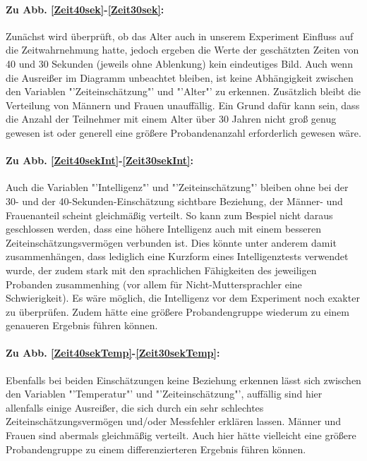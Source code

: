 \documentclass{Paper}
\begin{document}
\paragraph{Zu Abb. \ref{Zeit40sek}-\ref{Zeit30sek}:}
Zunächst wird überprüft, ob das Alter auch in unserem Experiment Einfluss auf die Zeitwahrnehmung hatte, jedoch ergeben die Werte der geschätzten Zeiten von 40 und 30 Sekunden (jeweils ohne Ablenkung) kein eindeutiges Bild. Auch wenn die Ausreißer im Diagramm unbeachtet bleiben, ist keine Abhängigkeit zwischen den Variablen "'Zeiteinschätzung"' und "'Alter"' zu erkennen. Zusätzlich bleibt die Verteilung von Männern und Frauen unauffällig. Ein Grund dafür kann sein, dass die Anzahl der Teilnehmer mit einem Alter über 30 Jahren nicht groß genug gewesen ist oder generell eine größere Probandenanzahl erforderlich gewesen wäre.

\paragraph{Zu Abb. \ref{Zeit40sekInt}-\ref{Zeit30sekInt}:} Auch die Variablen "'Intelligenz"' und "'Zeiteinschätzung"' bleiben ohne bei der 30- und der 40-Sekunden-Einschätzung sichtbare Beziehung, der Männer- und Frauenanteil scheint gleichmäßig verteilt. So kann zum Bespiel nicht daraus geschlossen werden, dass eine höhere Intelligenz auch mit einem besseren Zeiteinschätzungsvermögen verbunden ist. Dies könnte unter anderem damit zusammenhängen, dass lediglich eine Kurzform eines Intelligenztests verwendet wurde, der zudem stark mit den sprachlichen Fähigkeiten des jeweiligen Probanden zusammenhing (vor allem für Nicht-Muttersprachler eine Schwierigkeit). Es wäre möglich, die Intelligenz vor dem Experiment noch exakter zu überprüfen. Zudem hätte eine größere Probandengruppe wiederum zu einem genaueren Ergebnis führen können.

\paragraph{Zu Abb. \ref{Zeit40sekTemp}-\ref{Zeit30sekTemp}:} Ebenfalls bei beiden Einschätzungen keine Beziehung erkennen lässt sich zwischen den Variablen "'Temperatur"' und "'Zeiteinschätzung"', auffällig sind hier allenfalls einige Ausreißer, die sich durch ein sehr schlechtes Zeiteinschätzungsvermögen und/oder Messfehler erklären lassen. Männer und Frauen sind abermals gleichmäßig verteilt. Auch hier hätte vielleicht eine größere Probandengruppe zu einem differenzierteren Ergebnis führen können.
\end{document}
